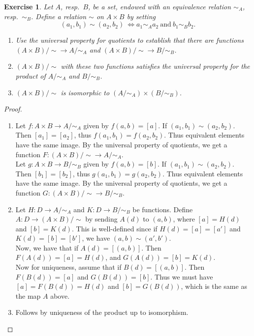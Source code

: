 \documentclass[a4paper, 11pt]{book}
\theoremstyle{plain}
\newtheorem{exercise}[theorem]{Exercise}
\theoremstyle{plain}
\begin{document}
\begin{exercise}
Let $A$, resp.\ $B$, be a set, endowed with an equivalence relation $\sim_A$, resp.\ $\sim_B$. Define a relation $\sim$ on $A\times B$ by setting
$$(a_1,b_1)\sim (a_2,b_2)~\Leftrightarrow a_1\sim_Aa_2~\text{and}~b_1\sim_B b_2.$$
\begin{enumerate}
    \item Use the universal property for quotients to establish that there are functions $(A\times B)/\sim\rightarrow A/\sim_A$ and $(A\times B)/\sim\rightarrow B/\sim_B$.
    \item $(A\times B)/\sim$ with these two functions satisfies the universal property for the product of $A/\sim_A$ and $B/\sim_B$.
    \item $(A\times B)/\sim$ is isomorphic to $(A/\sim_A)\times (B/\sim_B)$.
\end{enumerate}
\end{exercise}
\begin{proof}
\begin{enumerate}
    \item Let $f:A\times B\rightarrow A/\sim_A$ given by $f(a,b) = [a]$. If $(a_1,b_1)\sim (a_2,b_2)$. Then $[a_1]=[a_2]$, thus $f(a_1,b_1) = f(a_2,b_2)$. Thus equivalent elements have the same image. By the universal property of quotients, we get a function $F:(A\times B)/\sim\rightarrow A/\sim_A$.\\
    Let $g:A\times B\rightarrow B/\sim_B$ given by $f(a,b) = [b]$. If $(a_1,b_1)\sim (a_2,b_2)$. Then $[b_1]=[b_2]$, thus $g(a_1,b_1) = g(a_2,b_2)$. Thus equivalent elements have the same image. By the universal property of quotients, we get a function $G:(A\times B)/\sim\rightarrow B/\sim_B$.
    
    \item Let $H:D\rightarrow A/\sim_A$ and $K:D\rightarrow B/\sim_B$ be functions. Define $A:D\rightarrow (A\times B)/\sim$ by sending $A(d)$ to $(a,b)$, where $[a] = H(d)$ and $[b] = K(d)$. This is well-defined since if $H(d) = [a] = [a']$ and $K(d) = [b] = [b']$, we have $(a,b)\sim (a',b')$.\\
    Now, we have that if $A(d) = [(a,b)]$. Then $F(A(d)) = [a] = H(d)$, and $G(A(d)) = [b] = K(d)$.\\
    Now for uniqueness, assume that if $B(d) = [(a,b)]$. Then $F(B(d)) = [a]$ and $G(B(d)) = [b]$. Thus we must have $[a] = F(B(d)) = H(d)$ and $[b] = G(B(d))$, which is the same as the map $A$ above.
    
    \item Follows by uniqueness of the product up to isomorphism.
\end{enumerate}
\end{proof}
\end{document}
